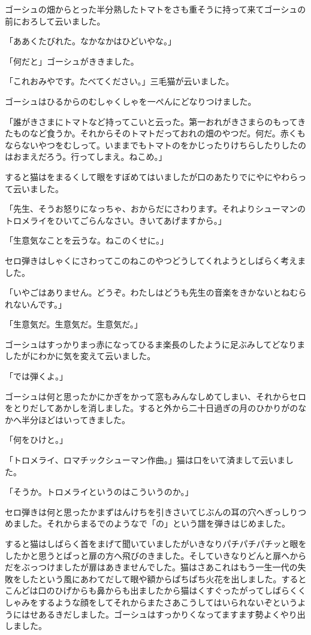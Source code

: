 \documentclass[uplatex,a5paper,twoside]{jsarticle}
\begin{document}
ゴーシュの畑からとった半分熟したトマトをさも重そうに持って来てゴーシュの前におろして云いました。

「ああくたびれた。なかなかはひどいやな。」

「何だと」ゴーシュがききました。

「これおみやです。たべてください。」三毛猫が云いました。

ゴーシュはひるからのむしゃくしゃを一ぺんにどなりつけました。

「誰がきさまにトマトなど持ってこいと云った。第一おれがきさまらのもってきたものなど食うか。それからそのトマトだっておれの畑のやつだ。何だ。赤くもならないやつをむしって。いままでもトマトのをかじったりけちらしたりしたのはおまえだろう。行ってしまえ。ねこめ。」

すると猫はをまるくして眼をすぼめてはいましたが口のあたりでにやにやわらって云いました。

「先生、そうお怒りになっちゃ、おからだにさわります。それよりシューマンのトロメライをひいてごらんなさい。きいてあげますから。」

「生意気なことを云うな。ねこのくせに。」

セロ弾きはしゃくにさわってこのねこのやつどうしてくれようとしばらく考えました。

「いやごはありません。どうぞ。わたしはどうも先生の音楽をきかないとねむられないんです。」

「生意気だ。生意気だ。生意気だ。」

ゴーシュはすっかりまっ赤になってひるま楽長のしたように足ぶみしてどなりましたがにわかに気を変えて云いました。

「では弾くよ。」

ゴーシュは何と思ったかにかぎをかって窓もみんなしめてしまい、それからセロをとりだしてあかしを消しました。すると外から二十日過ぎの月のひかりがのなかへ半分ほどはいってきました。

「何をひけと。」

「トロメライ、ロマチックシューマン作曲。」猫は口をいて済まして云いました。

「そうか。トロメライというのはこういうのか。」

セロ弾きは何と思ったかまずはんけちを引きさいてじぶんの耳の穴へぎっしりつめました。それからまるでのようなで「の」という譜を弾きはじめました。

すると猫はしばらく首をまげて聞いていましたがいきなりパチパチパチッと眼をしたかと思うとぱっと扉の方へ飛びのきました。そしていきなりどんと扉へからだをぶっつけましたが扉はあきませんでした。猫はさあこれはもう一生一代の失敗をしたという風にあわてだして眼や額からぱちぱち火花を出しました。するとこんどは口のひげからも鼻からも出ましたから猫はくすぐったがってしばらくくしゃみをするような顔をしてそれからまたさあこうしてはいられないぞというようにはせあるきだしました。ゴーシュはすっかりくなってますます勢よくやり出しました。
\end{document}
